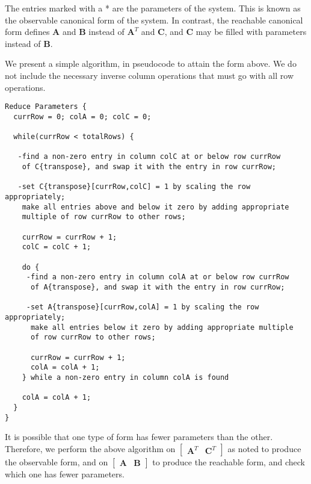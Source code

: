     The entries marked with a * are the parameters of the system.
This is known as the observable canonical form of the system. In
contrast, the reachable canonical form defines $\mathbf{A}$ and
$\mathbf{B}$ instead of $\mathbf{A}^T$ and $\mathbf{C}$, and
$\mathbf{C}$ may be filled with parameters instead of
$\mathbf{B}$.

    We present a simple algorithm, in pseudocode to attain the form
above. We do not include the necessary inverse column operations
that must go with all row operations.

\begin{singlespace}
\vspace{-12pt}
\small
\begin{verbatim}
Reduce Parameters {
  currRow = 0; colA = 0; colC = 0;

  while(currRow < totalRows) {

   -find a non-zero entry in column colC at or below row currRow 
    of C{transpose}, and swap it with the entry in row currRow;

   -set C{transpose}[currRow,colC] = 1 by scaling the row appropriately;
    make all entries above and below it zero by adding appropriate 
    multiple of row currRow to other rows;

    currRow = currRow + 1;
    colC = colC + 1;

    do {
     -find a non-zero entry in column colA at or below row currRow 
      of A{transpose}, and swap it with the entry in row currRow;

     -set A{transpose}[currRow,colA] = 1 by scaling the row appropriately;
      make all entries below it zero by adding appropriate multiple 
      of row currRow to other rows;

      currRow = currRow + 1;
      colA = colA + 1;
    } while a non-zero entry in column colA is found

    colA = colA + 1;
  }
}
\end{verbatim}
\vspace{-15pt}
\end{singlespace}

    It is possible that one type of form has fewer parameters than the
other. Therefore, we perform the above algorithm on $\left [
\begin{array} {cc} \mathbf{A}^T & \mathbf{C}^T
\end{array} \right ]$ as noted to produce the observable form, and on $\left [
\begin{array} {cc} \mathbf{A} & \mathbf{B} \end{array} \right
]$ to produce the reachable form, and check which one has fewer
parameters.

